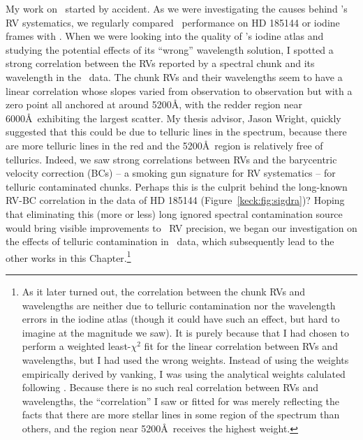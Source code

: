 My work on \keck\ started by accident. As we were investigating the
causes behind \het's RV systematics, we regularly compared \keck\
performance on HD 185144 or iodine frames with \het. When we were
looking into the quality of \het's iodine atlas and studying the
potential effects of its ``wrong'' wavelength solution, I spotted a
strong correlation between the RVs reported by a spectral chunk and
its wavelength in the \keck\ data. The chunk RVs and their wavelengths
seem to have a linear correlation whose slopes varied from observation
to observation but with a zero point all anchored at around 5200\AA,
with the redder region near 6000\AA\ exhibiting the largest
scatter. My thesis advisor, Jason Wright, quickly suggested that this
could be due to telluric lines in the spectrum, because there are more
telluric lines in the red and the 5200\AA\ region is relatively free
of tellurics. Indeed, we saw strong correlations between RVs and the
barycentric velocity correction (BCs) -- a smoking gun signature for
RV systematics -- for telluric contaminated chunks. Perhaps this is
the culprit behind the long-known RV-BC correlation in the data of HD
185144 (Figure~\ref{keck:fig:sigdra})? Hoping that eliminating this
(more or less) long ignored spectral contamination source would bring
visible improvements to \keck\ RV precision, we began our
investigation on the effects of telluric contamination in \keck\ data,
which subsequently lead to the other works in this
Chapter.\footnote{As it later turned out, the correlation between the
chunk RVs and wavelengths are neither due to telluric contamination
nor the wavelength errors in the iodine atlas (though it could have
such an effect, but hard to imagine at the magnitude we saw). It is
purely because that I had chosen to perform a weighted least-$\chi^2$
fit for the linear correlation between RVs and wavelengths, but I had
used the wrong weights. Instead of using the weights empirically
derived by vanking, I was using the analytical weights calulated
following \ciute{butler1996}. Because there is no such real
correlation between RVs and wavelengths, the ``correlation'' I saw or
fitted for was merely reflecting the facts that there are more stellar
lines in some region of the spectrum than others, and the region near
5200\AA\ receives the highest weight.}
 
